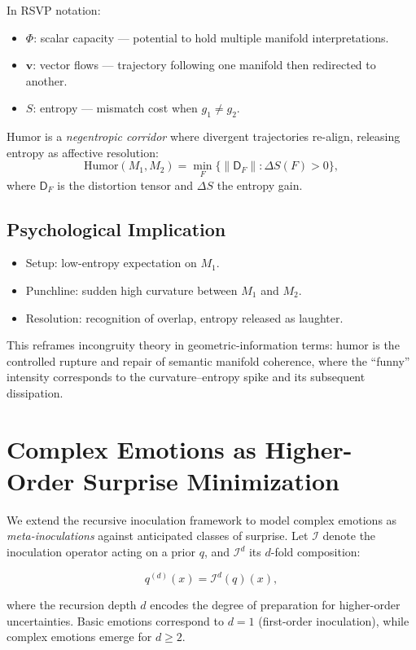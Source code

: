 \documentclass{article}
\theoremstyle{definition}
\begin{document}
In RSVP notation:
\begin{itemize}
  \item $\Phi$: scalar capacity --- potential to hold multiple manifold interpretations.
  \item $\mathbf{v}$: vector flows --- trajectory following one manifold then redirected to another.
  \item $S$: entropy --- mismatch cost when $g_1 \neq g_2$.
\end{itemize}

Humor is a \emph{negentropic corridor} where divergent trajectories re-align, releasing entropy as affective resolution:
\[
\text{Humor}(M_1,M_2) =
\min_{F} \big\{ \|\mathsf{D}_F\| : \Delta S(F) > 0 \big\},
\]
where $\mathsf{D}_F$ is the distortion tensor and $\Delta S$ the entropy gain.

\subsection{Psychological Implication}

\begin{itemize}
  \item Setup: low-entropy expectation on $M_1$.
  \item Punchline: sudden high curvature between $M_1$ and $M_2$.
  \item Resolution: recognition of overlap, entropy released as laughter.
\end{itemize}

This reframes incongruity theory in geometric-information terms: humor is the controlled rupture and repair 
of semantic manifold coherence, where the ``funny'' intensity corresponds to the curvature–entropy spike 
and its subsequent dissipation.

\section{Complex Emotions as Higher-Order Surprise Minimization}

We extend the recursive inoculation framework to model complex emotions as 
\emph{meta-inoculations} against anticipated classes of surprise. Let 
$\mathcal{I}$ denote the inoculation operator acting on a prior $q$, and 
$\mathcal{I}^d$ its $d$-fold composition:

\[
q^{(d)}(x) = \mathcal{I}^d(q)(x),
\]

where the recursion depth $d$ encodes the degree of preparation for 
higher-order uncertainties. Basic emotions correspond to $d=1$ 
(first-order inoculation), while complex emotions emerge for $d \geq 2$.
\end{document}
